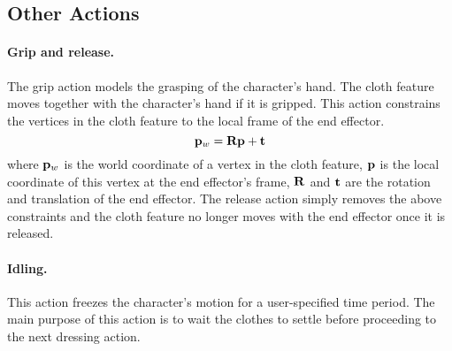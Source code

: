 \subsection{Other Actions}

\paragraph{Grip and release.}
The grip action models the grasping of the character's hand. The cloth feature moves together with the character's hand if it is gripped. This action constrains the vertices in the cloth feature to the local frame of the end effector.
\begin{displaymath}
\mathbf{p}_w = \mathbf{Rp} + \mathbf{t}
\end{displaymath}
where $\mathbf{p}_w$ is the world coordinate of a vertex in the cloth feature, $\mathbf{p}$ is the local coordinate of this vertex at the end effector's frame, $\mathbf{R}$ and $\mathbf{t}$ are the rotation and translation of the end effector. The release action simply removes the above constraints and the cloth feature no longer moves with the end effector once it is released.

\paragraph{Idling.} This action freezes the character's motion for a user-specified time period. The main purpose of this action is to wait the clothes to settle before proceeding to the next dressing action.

